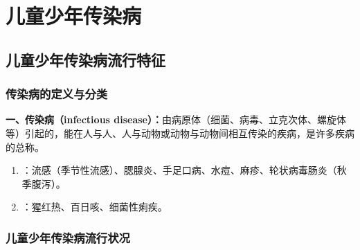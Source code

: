 \chapter{儿童少年传染病}
\setcounter{chapter}{9}

\section{儿童少年传染病流行特征}

\subsection{传染病的定义与分类}

\begin{keybox}
\textbf{一、传染病（infectious disease）：}由病原体（细菌、病毒、立克次体、螺旋体等）引起的，能在人与人、人与动物或动物与动物间相互传染的疾病，是许多疾病的总称。
\begin{enumerate}[leftmargin=*]
    \item {}：流感（季节性流感）、腮腺炎、手足口病、水痘、麻疹、轮状病毒肠炎（秋季腹泻）。
    \item {}：猩红热、百日咳、细菌性痢疾。
\end{enumerate}
\end{keybox}

\subsection{儿童少年传染病流行状况}

